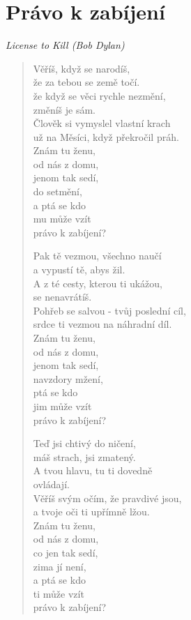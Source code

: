 \section*{Právo k zabíjení}

\textit{License to Kill (Bob Dylan)}

\begin{verse}
 Věříš, když se narodíš,\\ 
 že za tebou se země točí.\\
 že když se věci rychle nezmění, \\
 změníš je sám.\\
 Člověk si vymyslel vlastní krach\\
 už na Měsíci, když překročil práh.\\
 Znám tu ženu,\\
 od nás z domu,\\
 jenom tak sedí,\\
 do setmění,\\
 a ptá se kdo \\
 mu může vzít \\
 právo k zabíjení?
 
 Pak tě vezmou, všechno naučí \\
 a vypustí tě, abys žil. \\
 A z té cesty, kterou ti ukážou,  \\
 se nenavrátíš. \\
 Pohřeb se salvou - tvůj poslední cíl, \\
 srdce ti vezmou na náhradní díl. \\
 Znám tu ženu, \\
 od nás z domu, \\
 jenom tak sedí, \\
 navzdory mžení, \\
 ptá se kdo \\
 jim může vzít \\
 právo k zabíjení?
 
 Teď jsi chtivý do ničení, \\
 máš strach, jsi zmatený. \\
 A tvou hlavu, tu ti dovedně \\
 ovládají. \\
 Věříš svým očím, že pravdivé jsou, \\
 a tvoje oči ti upřímně lžou. \\
 Znám tu ženu, \\
 od nás z domu, \\
 co jen tak sedí, \\
 zima jí není, \\
 a ptá se kdo \\
 ti může vzít \\
 právo k zabíjení?
 

\end{verse}
